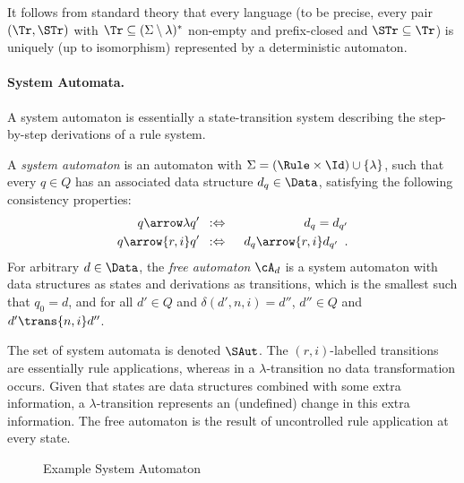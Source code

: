 %
It follows from standard theory that every language (to be precise, every pair
$(\Tr,\STr)$ with $\Tr\subseteq(\Sigma\setminus\lambda)^*$ non-empty and
prefix-closed and $\STr \subseteq \Tr$) is uniquely (up to isomorphism)
represented by a deterministic automaton.

\paragraph{System Automata.}

A system automaton is essentially a state-transition system describing the
step-by-step derivations of a rule system.

\begin{definition}
  A \emph{system automaton} is an automaton with $\Sigma = (\Rule \times
  \Id) \cup \{ \lambda \}$, such that every $q\in Q$ has an associated data
  structure $d_q\in \Data$, satisfying the following consistency properties:
\begin{eqnarray*}
q \arrow\lambda q'
  & \enspace:\Leftrightarrow\enspace
  & d_q=d_{q'} \\
q \arrow{r,i} q'
  & \enspace:\Leftrightarrow\enspace
  & d_q \arrow{r,i} d_{q'} \enspace.
\end{eqnarray*}
For arbitrary $d\in \Data$, the \emph{free automaton} $\cA_d$ is a system
automaton with data structures as states and derivations as transitions, which
is the smallest such that $q_0=d$, and for all $d'\in Q$ and
$\delta(d',n,i)=d''$, $d''\in Q$ and $d'\trans{n,i} d''$.
\end{definition}
%
The set of system automata is denoted $\SAut$. The $(r,i)$-labelled transitions
are essentially rule applications, whereas in a $\lambda$-transition no data
transformation occurs. Given that states are data structures combined with some
extra information, a $\lambda$-transition represents an (undefined) change in
this extra information. The free automaton is the result of uncontrolled rule
application at every state.
%
\begin{figure}[tb]
\centering
{}
\caption{Example System Automaton}
\label{fig:sa_example}
\end{figure}

